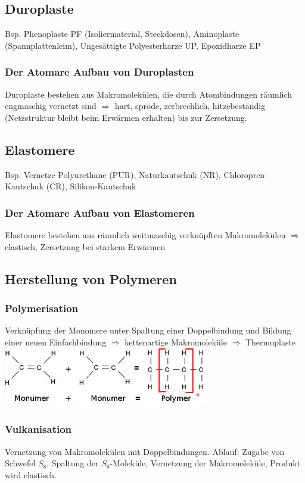 \subsection{Duroplaste}
Bsp. Phenoplaste PF (Isoliermaterial, Steckdosen), Aminoplaste (Spannplattenleim), Ungesättigte Polyesterharze UP, Epoxidharze EP
\subsubsection{Der Atomare Aufbau von Duroplasten}
Duroplaste bestehen aus Makromolekülen, die durch Atombindungen räumlich engmaschig vernetzt sind $\Rightarrow$ hart, spröde, zerbrechlich, hitzebeständig (Netzstruktur bleibt beim Erwärmen erhalten) bis zur Zersetzung.

\subsection{Elastomere}
Bsp. Vernetze Polyurethane (PUR), Naturkautschuk (NR), Chloropren-Kautschuk (CR), Silikon-Kautschuk
\subsubsection{Der Atomare Aufbau von Elastomeren}
Elastomere bestehen aus räumlich weitmaschig verknüpften Makromolekülen $\Rightarrow$ elastisch, Zersetzung bei starkem Erwärmen

\subsection{Herstellung von Polymeren}
\subsubsection{Polymerisation} 
Verknüpfung der Monomere unter Spaltung einer Doppelbindung und Bildung einer neuen Einfachbindung $\Rightarrow$ kettenartige Makromoleküle $\Rightarrow$ Thermoplaste \\
\includegraphics[width=9cm]{images/Polymerisation.png}

\subsubsection{Vulkanisation}
Vernetzung von Makromolekülen mit Doppelbindungen. Ablauf: Zugabe von Schwefel $S_8$, Spaltung der $S_8$-Moleküle, Vernetzung der Makromoleküle, Produkt wird elastisch. 